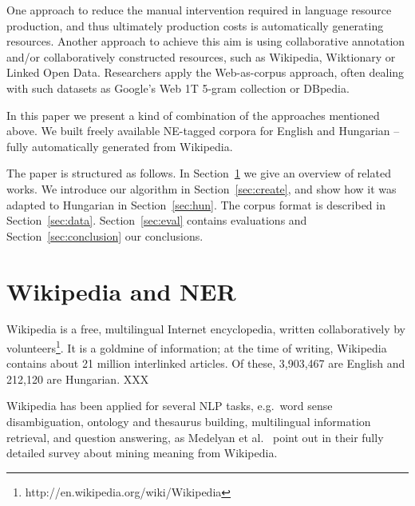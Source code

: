 \documentclass[11pt]{article}
\begin{document}
One approach to reduce the manual intervention required in language resource production, and thus ultimately production costs is automatically generating resources. Another approach to achieve this aim is using collaborative annotation and/or collaboratively constructed resources, such as Wikipedia, Wiktionary or Linked Open Data. Researchers apply the Web-as-corpus approach, often dealing with such datasets as Google's Web 1T 5-gram collection or DBpedia.  



In this paper we present a kind of combination of the approaches mentioned above. We built freely available NE-tagged corpora for English and Hungarian -- fully automatically generated from Wikipedia. %

The paper is structured as follows. In Section~\ref{sec:related} we give an overview of related works. We introduce our algorithm in Section~\ref{sec:create}, and show how it was adapted to Hungarian in Section~\ref{sec:hun}. The corpus format is described in Section~\ref{sec:data}. Section~\ref{sec:eval} contains evaluations and Section~\ref{sec:conclusion} our conclusions.

\section{Wikipedia and NER}
\label{sec:related}

Wikipedia is a free, multilingual Internet encyclopedia, written collaboratively by volunteers\footnote{http://en.wikipedia.org/wiki/Wikipedia}. It is a goldmine of information; at the time of writing, Wikipedia contains about 21 million interlinked articles. Of these, 3,903,467 are English and 212,120 are Hungarian. XXX %

Wikipedia has been applied for several NLP tasks, e.g.~word sense disambiguation, ontology and thesaurus building, multilingual information retrieval, and question answering, as Medelyan et al.~ point out in their fully detailed survey about mining meaning from Wikipedia. 
\end{document}
